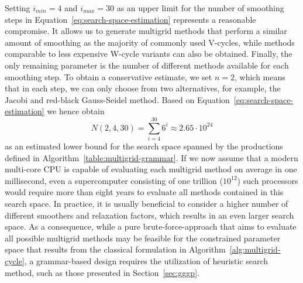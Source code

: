 Setting $i_{min} = 4$ and $i_{max} = 30$ as an upper limit for the number of smoothing steps in Equation~\eqref{eq:search-space-estimation} represents a reasonable compromise. 
It allows us to generate multigrid methods that perform a similar amount of smoothing as the majority of commonly used V-cycles, while methods comparable to less expensive W-cycle variants can also be obtained.
Finally, the only remaining parameter is the number of different methods available for each smoothing step.
To obtain a conservative estimate, we set $n = 2$, which means that in each step, we can only choose from two alternatives, for example, the Jacobi and red-black Gauss-Seidel method.
Based on Equation~\eqref{eq:search-space-estimation} we hence obtain 
\begin{equation}\tag{4.12}
	N(2, 4, 30) = \sum_{i = 4}^{30} 6^i \approx 2.65 \cdot 10^{24}
\end{equation}
as an estimated lower bound for the search space spanned by the productions defined in Algorithm~\ref{table:multigrid-grammar}.
If we now assume that a modern multi-core CPU is capable of evaluating each multigrid method on average in one millisecond,
even a supercomputer consisting of one trillion ($10^{12}$) such processors would require more than eight years to evaluate all methods contained in this search space.
In practice, it is usually beneficial to consider a higher number of different smoothers and relaxation factors, which results in an even larger search space.
As a consequence, while a pure brute-force-approach that aims to evaluate all possible multigrid methods may be feasible for the constrained parameter space that results from the classical formulation in Algorithm~\ref{alg:multigrid-cycle}, a grammar-based design requires the utilization of heuristic search method, such as those presented in Section~\ref{sec:gggp}.
